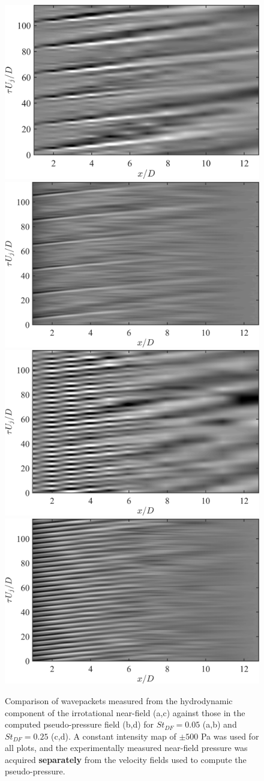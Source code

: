 \begin{figure}
	\centering
		\includegraphics[width=0.45\linewidth]{Figures/ch5_st005_NearField_wvpkts.png}
		\includegraphics[width=0.45\linewidth]{Figures/ch5_st005_FlowField_wvpkts.png}\\
		\includegraphics[width=0.45\linewidth]{Figures/ch5_st025_NearField_wvpkts.png}
		\includegraphics[width=0.45\linewidth]{Figures/ch5_st025_FlowField_wvpkts.png}
	\caption{Comparison of wavepackets measured from the hydrodynamic component of the irrotational near-field (a,c) against those in the computed pseudo-pressure field (b,d) for $St_{DF} = 0.05$ (a,b) and $St_{DF} = 0.25$ (c,d). A constant intensity map of $\pm 500$ Pa was used for all plots, and the experimentally measured near-field pressure was acquired \textbf{separately} from the velocity fields used to compute the pseudo-pressure.}
	\label{fig:flowfield_wvpkts}
\end{figure}

